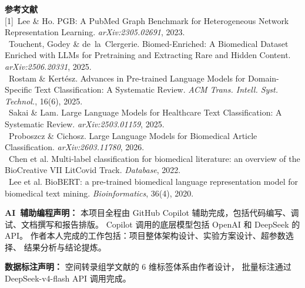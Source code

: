 \documentclass[12pt,a4paper]{ctexart}
\begin{document}
\bigskip
\noindent\textbf{参考文献}\\[2pt]
{\small
[1]~Lee \& Ho. PGB: A PubMed Graph Benchmark for Heterogeneous Network Representation Learning. \textit{arXiv:2305.02691}, 2023.\\
[2]~Touchent, Godey \& de~la~Clergerie. Biomed-Enriched: A Biomedical Dataset Enriched with LLMs for Pretraining and Extracting Rare and Hidden Content. \textit{arXiv:2506.20331}, 2025.\\
[3]~Rostam \& Kert\'{e}sz. Advances in Pre-trained Language Models for Domain-Specific Text Classification: A Systematic Review. \textit{ACM Trans. Intell. Syst. Technol.}, 16(6), 2025.\\
[4]~Sakai \& Lam. Large Language Models for Healthcare Text Classification: A Systematic Review. \textit{arXiv:2503.01159}, 2025.\\
[5]~Proboszcz \& Cichosz. Large Language Models for Biomedical Article Classification. \textit{arXiv:2603.11780}, 2026.\\
[6]~Chen et al. Multi-label classification for biomedical literature: an overview of the BioCreative VII LitCovid Track. \textit{Database}, 2022.\\
[7]~Lee et al. BioBERT: a pre-trained biomedical language representation model for biomedical text mining. \textit{Bioinformatics}, 36(4), 2020.\\
}

\bigskip

\noindent\textbf{AI~辅助编程声明：}
本项目全程由 GitHub Copilot 辅助完成，包括代码编写、调试、文档撰写和报告排版。
Copilot 调用的底层模型包括 OpenAI 和 DeepSeek 的 API。
作者本人完成的工作包括：项目整体架构设计、实验方案设计、超参数选择、
结果分析与结论提炼。

\bigskip
\noindent\textbf{数据标注声明：}
空间转录组学文献的 6 维标签体系由作者设计，
批量标注通过 DeepSeek-v4-flash API 调用完成。
\end{document}
